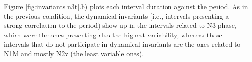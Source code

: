 Figure \ref{fig:invariants n3t}.b) plots each interval duration against the period. As in the previous condition, the dynamical invariants (i.e., intervals presenting a strong correlation to the period) show up in the intervals related to N3 phase, which were the ones presenting also the highest variability, whereas those intervals that do not participate in dynamical invariants are the ones related to N1M and mostly N2v (the least variable ones). 




